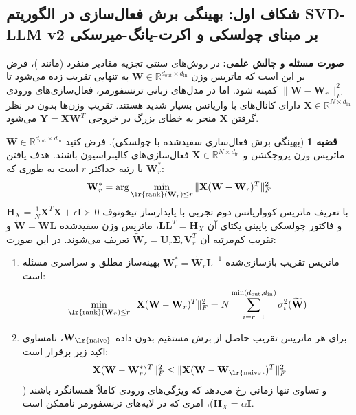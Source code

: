 \documentclass[12pt,a4paper]{report}
\theoremstyle{definition}
\newtheorem{theorem}{قضیه}[chapter]
\begin{document}
\subsection{شکاف اول: بهینگی برش فعال‌سازی در الگوریتم SVD-LLM v2 بر مبنای چولسکی و اکرت-یانگ-میرسکی}
\label{subsec:gap1_svdllm_v2}
\textbf{صورت مسئله و چالش علمی:} در روش‌های سنتی تجزیه مقادیر منفرد (مانند )، فرض بر این است که ماتریس وزن $\mathbf{W} \in \mathbb{R}^{d_{\text{out}} \times d_{\text{in}}}$ به تنهایی تقریب زده می‌شود تا $\|\mathbf{W} - \mathbf{W}_r\|_F^2$ کمینه شود. اما در مدل‌های زبانی ترنسفورمر، فعال‌سازی‌های ورودی $\mathbf{X} \in \mathbb{R}^{N \times d_{\text{in}}}$ دارای کانال‌های با واریانس بسیار شدید هستند. تقریب وزن‌ها بدون در نظر گرفتن $\mathbf{X}$ منجر به خطای بزرگ در خروجی $\mathbf{Y} = \mathbf{X}\mathbf{W}^T$ می‌شود.

\begin{theorem}[بهینگی برش فعال‌سازی سفیدشده با چولسکی]
\label{thm:svdllm_v2_optimality}
فرض کنید $\mathbf{W} \in \mathbb{R}^{d_{\text{out}} \times d_{\text{in}}}$ ماتریس وزن پروجکشن و $\mathbf{X} \in \mathbb{R}^{N \times d_{\text{in}}}$ فعال‌سازی‌های کالیبراسیون باشند. هدف یافتن $\mathbf{W}_r^*$ با رتبه حداکثر $r$ است به طوری که:
\begin{equation}
\mathbf{W}_r^* = \arg\min_{\text{\lr{rank}}(\mathbf{W}_r) \le r} \|\mathbf{X}(\mathbf{W} - \mathbf{W}_r)^T\|_F^2
\end{equation}
با تعریف ماتریس کوواریانس دوم تجربی با پایدارساز تیخونوف $\mathbf{H}_X = \frac{1}{N}\mathbf{X}^T\mathbf{X} + \epsilon \mathbf{I} \succ 0$ و فاکتور چولسکی پایینی یکتای آن $\mathbf{L}\mathbf{L}^T = \mathbf{H}_X$، ماتریس وزن سفیدشده $\widetilde{\mathbf{W}} = \mathbf{W}\mathbf{L}$ و تقریب کم‌مرتبه آن $\widetilde{\mathbf{W}}_r = \mathbf{U}_r \mathbf{\Sigma}_r \mathbf{V}_r^T$ تعریف می‌شوند. در این صورت:
\begin{enumerate}
    \item ماتریس تقریب بازسازی‌شده $\mathbf{W}_r^* = \widetilde{\mathbf{W}}_r \mathbf{L}^{-1}$ بهینه‌ساز مطلق و سراسری مسئله است:
    \begin{equation}
    \min_{\text{\lr{rank}}(\mathbf{W}_r) \le r} \|\mathbf{X}(\mathbf{W} - \mathbf{W}_r)^T\|_F^2 = N \sum_{i=r+1}^{\min(d_{\text{out}}, d_{\text{in}})} \sigma_i^2(\widetilde{\mathbf{W}})
    \end{equation}
    \item برای هر ماتریس تقریب حاصل از برش مستقیم بدون داده $\mathbf{W}_{\text{\lr{naive}}}$، نامساوی اکید زیر برقرار است:
    \begin{equation}
    \|\mathbf{X}(\mathbf{W} - \mathbf{W}_r^*)^T\|_F^2 \le \|\mathbf{X}(\mathbf{W} - \mathbf{W}_{\text{\lr{naive}}})^T\|_F^2
    \end{equation}
    و تساوی تنها زمانی رخ می‌دهد که ویژگی‌های ورودی کاملاً همسانگرد باشند ($\mathbf{H}_X = \alpha \mathbf{I}$)، امری که در لایه‌های ترنسفورمر ناممکن است.
\end{enumerate}
\end{theorem}
\end{document}
